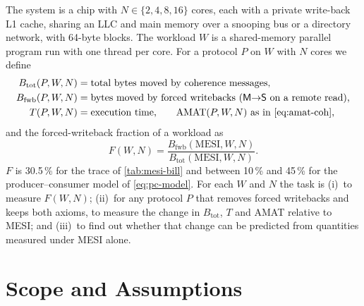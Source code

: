 The system is a chip with $N\in\{2,4,8,16\}$ cores, each with a private
write-back L1 cache, sharing an LLC and main memory over a snooping bus or a
directory network, with 64-byte blocks. The workload $W$ is a shared-memory
parallel program run with one thread per core. For a protocol $P$ on $W$ with
$N$ cores we define
\begin{align*}
  B_{\mathrm{tot}}(P,W,N) &= \text{total bytes moved by coherence messages,}\\
  B_{\mathrm{fwb}}(P,W,N) &= \text{bytes moved by forced writebacks
      (\stM$\to$\stS\ on a remote read),}\\
  T(P,W,N) &= \text{execution time,}\qquad
  \mathrm{AMAT}(P,W,N) \text{ as in \cref{eq:amat-coh},}
\end{align*}
and the forced-writeback fraction of a workload as
\begin{equation}
  F(W,N) = \frac{B_{\mathrm{fwb}}(\mathrm{MESI},W,N)}{B_{\mathrm{tot}}(\mathrm{MESI},W,N)}.
  \label{eq:fwb-fraction}
\end{equation}
$F$ is 30.5\,\% for the trace of \cref{tab:mesi-bill} and between 10\,\% and
45\,\% for the producer--consumer model of \cref{eq:pc-model}. For each $W$ and
$N$ the task is (i)~to measure $F(W,N)$; (ii)~for any protocol $P$ that removes
forced writebacks and keeps both axioms, to measure the change in
$B_{\mathrm{tot}}$, $T$ and AMAT relative to MESI; and (iii)~to find out whether
that change can be predicted from quantities measured under MESI alone.

\section{Scope and Assumptions}
\label{sec:prob-scope}
%

